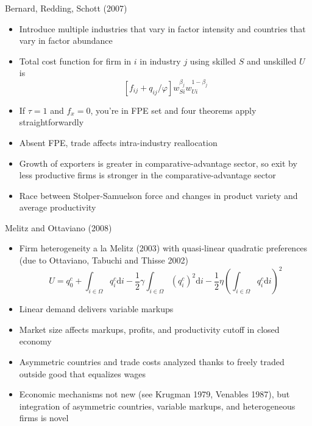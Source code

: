\documentclass[10pt,notes=hide]{beamer}
\begin{document}
\begin{frame}{Bernard, Redding, Schott (2007)}
\begin{itemize}
	\item Introduce multiple industries that vary in factor intensity and countries that vary in factor abundance
	\item Total cost function for firm in $i$ in industry $j$ using skilled $S$ and unskilled $U$ is
	$$
	\left[f_{ij}+q_{ij}/\varphi\right] w_{Si}^{\beta_j} w_{Ui}^{1-\beta_j}
	$$
	\item If $\tau=1$ and $f_x=0$, you're in FPE set and four theorems apply straightforwardly
	\item Absent FPE, trade affects intra-industry reallocation
	\item Growth of exporters is greater in comparative-advantage sector,
	so exit by less productive firms is stronger in the comparative-advantage sector
	\item Race between Stolper-Samuelson force and changes in product variety and average productivity
\end{itemize}
\end{frame}
\begin{frame}{Melitz and Ottaviano (2008)}
\begin{itemize}
	\item Firm heterogeneity a la Melitz (2003) with quasi-linear quadratic preferences 
	(due to Ottaviano, Tabuchi and Thisse 2002)
	\begin{equation*}
		U = 
		q_0^c 
		+ \int_{i\in \Omega} q_i^c \textrm{d}i 
		- \frac{1}{2} \gamma \int_{i\in \Omega} \left(q_i^c\right)^2 \textrm{d}i 
		- \frac{1}{2} \eta \left(\int_{i\in \Omega} q_i^c \textrm{d}i\right)^2
	\end{equation*}
	\item Linear demand delivers variable markups
	\item Market size affects markups, profits, and productivity cutoff in closed economy
	\item Asymmetric countries and trade costs analyzed thanks to freely traded outside good that equalizes wages
	\item Economic mechanisms not new (see Krugman 1979, Venables 1987), but integration of asymmetric countries, variable markups, and heterogeneous firms is novel
\end{itemize}
\end{frame}
\end{document}

